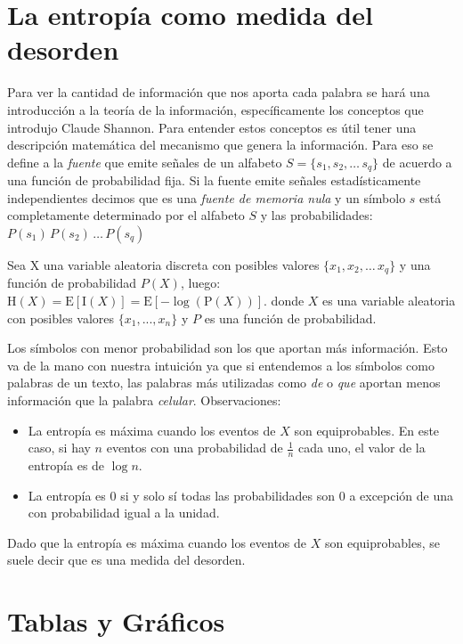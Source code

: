 \section{La entropía como medida del desorden}
\label{sub:entropiaShannon}

Para ver la cantidad de información que nos aporta cada palabra se hará una introducción a la teoría de la información, específicamente
los conceptos que introdujo Claude Shannon\cite{shannon2001mathematical}.
Para entender estos conceptos es útil tener una descripción matemática del mecanismo que genera la información. Para eso se define a 
la \textit{fuente} que emite señales de un alfabeto $ S = \{s_1, s_2, \dots\, s_q\}$ de acuerdo a una función de probabilidad fija.
Si la fuente emite señales estadísticamente independientes decimos que es una \textit{fuente de memoria nula} y un símbolo $s$ está completamente determinado por el alfabeto $S$ y las probabilidades:
$P(s_1)\,P(s_2)\, \dots\, P(s_q)$

Sea X una variable aleatoria discreta con posibles valores $\{x_1, x_2, \dots\, x_q\}$ y una función de probabilidad $P(X)$, luego:
${\displaystyle \mathrm {H} (X)=\mathrm {E} [\mathrm {I} (X)]=\mathrm {E} [-\log(\mathrm {P} (X))].}$
donde $X$ es una variable aleatoria con posibles valores $\{x_1, ... , x_n\}$ y $P$ es una función de probabilidad.

Los símbolos con menor probabilidad son los que aportan más información. Esto va de la mano con nuestra intuición ya que si entendemos a los símbolos como palabras de un texto, las palabras más utilizadas como \textit{de} o \textit{que} aportan menos información que la palabra \textit{celular}. 
Observaciones:
\begin{itemize}
    \item La entropía es máxima cuando los eventos de $X$ son equiprobables. En este caso, si hay $n$ eventos con una probabilidad de $\frac{1}{n}$ cada uno, el valor de la entropía es de $\log n$.
    \item La entropía es 0 si y solo sí todas las probabilidades son 0 a excepción de una con probabilidad igual a la unidad. 
\end{itemize}

Dado que la entropía es máxima cuando los eventos de $X$ son equiprobables, se suele decir que es una medida del desorden.


\section{Tablas y Gráficos}
\label{sub:tablas}

